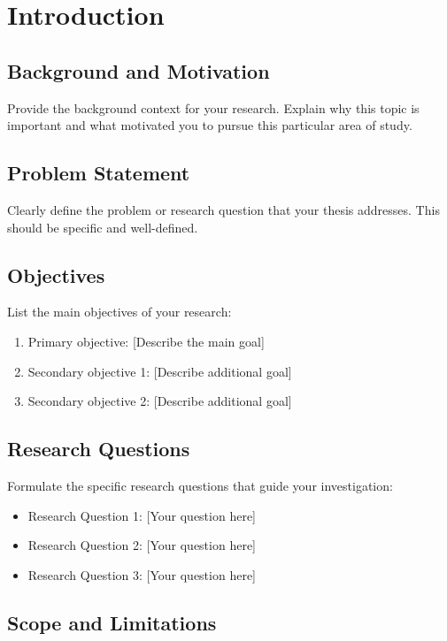\chapter{Introduction}

\section{Background and Motivation}

Provide the background context for your research. Explain why this topic is important and what motivated you to pursue this particular area of study.

\section{Problem Statement}

Clearly define the problem or research question that your thesis addresses. This should be specific and well-defined.

\section{Objectives}

List the main objectives of your research:

\begin{enumerate}
    \item Primary objective: [Describe the main goal]
    \item Secondary objective 1: [Describe additional goal]
    \item Secondary objective 2: [Describe additional goal]
\end{enumerate}

\section{Research Questions}

Formulate the specific research questions that guide your investigation:

\begin{itemize}
    \item Research Question 1: [Your question here]
    \item Research Question 2: [Your question here]
    \item Research Question 3: [Your question here]
\end{itemize}

\section{Scope and Limitations}

